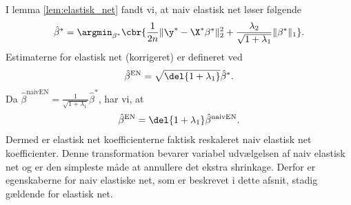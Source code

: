 I lemma \ref{lem:elastisk_net} fandt vi, at naiv elastisk net løser følgende 
\begin{align}
\hat{\beta}^* = \argmin_{\beta^*} \cbr{\frac{1}{2n} \Vert \y^* - \X^* \beta^* \Vert_2^2 + \frac{\lambda_2}{\sqrt{1+\lambda_1}} \Vert \beta^* \Vert_1}. \label{eq:EN8}
\end{align}
Estimaterne for elastisk net (korrigeret) er defineret ved
\begin{align*}
\hat{\beta}^\text{EN} = \sqrt{\del{1+\lambda_1}} \hat{\beta}^*.
\end{align*}
Da \(\hat{\beta}^\text{naivEN} = \frac{1}{\sqrt{1+\lambda_1}} \hat{\beta}^*\), har vi, at
\begin{align*}
\hat{\beta}^\text{EN} = \del{1+\lambda_1} \hat{\beta}^\text{naivEN}.
\end{align*}
Dermed er elastisk net koefficienterne faktisk reskaleret naiv elastisk net koefficienter.
Denne transformation bevarer variabel udvælgelsen af naiv elastisk net og er den simpleste måde at annullere det ekstra shrinkage.
Derfor er egenskaberne for naiv elastiske net, som er beskrevet i dette afsnit, stadig gældende for elastisk net.

